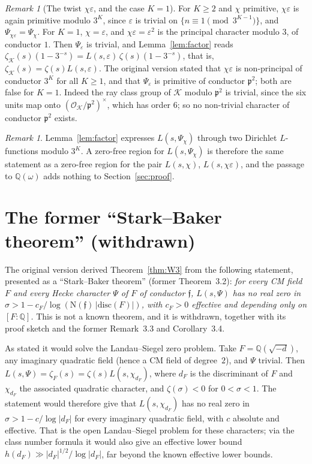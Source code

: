 \documentclass[12pt]{amsart}
\theoremstyle{plain}
\theoremstyle{definition}
\theoremstyle{remark}
\newtheorem{remark}[theorem]{Remark}
\newcommand{\Q}{\mathbb{Q}}
\newcommand{\Qomega}{\Q(\omega)}
\newcommand{\K}{\mathcal{K}}          %
\newcommand{\OK}{\mathcal{O}_{\K}}
\newcommand{\Nf}{\mathrm{N}}          %
\newcommand{\disc}{\mathrm{disc}}
\newcommand{\pp}{\mathfrak{p}}        %
\begin{document}
\begin{remark}[The twist $\chi\varepsilon$, and the case $K = 1$]
\label{rem:chieps}
For $K \geq 2$ and $\chi$ primitive, $\chi\varepsilon$ is again primitive
modulo $3^K$, since $\varepsilon$ is trivial on $\{n \equiv 1 \pmod{3^{K-1}}\}$,
and $\Psi_{\chi\varepsilon} = \Psi_\chi$. For $K = 1$, $\chi = \varepsilon$,
and $\chi\varepsilon = \varepsilon^2$ is the principal character modulo $3$,
of conductor $1$. Then $\Psi_\varepsilon$ is trivial, and
Lemma~\ref{lem:factor} reads $\zeta_\K(s)(1 - 3^{-s}) =
L(s,\varepsilon)\,\zeta(s)(1-3^{-s})$, that is, $\zeta_\K(s) =
\zeta(s)L(s,\varepsilon)$. The original version stated that $\chi\varepsilon$
is non-principal of conductor $3^K$ for all $K \geq 1$, and that
$\Psi_\varepsilon$ is primitive of conductor $\pp^2$; both are false for
$K = 1$. Indeed the ray class group of $\K$ modulo $\pp^2$ is trivial, since
the six units map onto $(\OK/\pp^2)^\times$, which has order $6$; so no
non-trivial character of conductor $\pp^2$ exists.
\end{remark}

\begin{remark}
Lemma~\ref{lem:factor} expresses $L(s,\Psi_\chi)$ through two Dirichlet
$L$-functions modulo $3^K$. A zero-free region for $L(s,\Psi_\chi)$ is
therefore the same statement as a zero-free region for the pair $L(s,\chi)$,
$L(s,\chi\varepsilon)$, and the passage to $\Qomega$ adds nothing to
Section~\ref{sec:proof}.
\end{remark}

\section{The former ``Stark--Baker theorem'' (withdrawn)}
\label{sec:stark}

The original version derived Theorem~\ref{thm:W3} from the following
statement, presented as a ``Stark--Baker theorem'' (former Theorem~3.2):
\emph{for every CM field $F$ and every Hecke character $\Psi$ of $F$ of
conductor $\mathfrak f$, $L(s,\Psi)$ has no real zero in
$\sigma > 1 - c_F/\log(\Nf(\mathfrak f)\,|\disc(F)|)$, with $c_F > 0$
effective and depending only on $[F:\Q]$.} This is not a known theorem, and
it is withdrawn, together with its proof sketch and the former Remark~3.3
and Corollary~3.4.

As stated it would solve the Landau--Siegel zero problem. Take
$F = \Q(\sqrt{-d})$, any imaginary quadratic field (hence a CM field of
degree~$2$), and $\Psi$ trivial. Then $L(s,\Psi) = \zeta_F(s) =
\zeta(s)L(s,\chi_{d_F})$, where $d_F$ is the discriminant of $F$ and
$\chi_{d_F}$ the associated quadratic character, and $\zeta(\sigma) < 0$ for
$0 < \sigma < 1$. The statement would therefore give that $L(s,\chi_{d_F})$
has no real zero in $\sigma > 1 - c/\log|d_F|$ for every imaginary quadratic
field, with $c$ absolute and effective. That is the open Landau--Siegel
problem for these characters; via the class number formula it would also
give an effective lower bound $h(d_F) \gg |d_F|^{1/2}/\log|d_F|$, far
beyond the known effective lower bounds.
\end{document}
